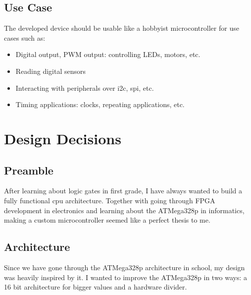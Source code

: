 \subsection*{Use Case}
The developed device should be usable like a hobbyist microcontroller for use cases such as:
\begin{itemize}
    \item Digital output, PWM output: controlling LEDs, motors, etc.
    \item Reading digital sensors
    \item Interacting with peripherals over i2c, spi, etc.
    \item Timing applications: clocks, repeating applications, etc.
\end{itemize}

\newpage
\tableofcontents
{}
\newpage

\section{Design Decisions}
\subsection{Preamble}
After learning about logic gates in first grade, I have always wanted to build a fully functional cpu architecture.
Together with going through FPGA development in electronics and learning about the ATMega328p in informatics, making a custom microcontroller seemed like a perfect thesis to me.

\subsection{Architecture}
Since we have gone through the ATMega328p architecture \cite{atmega328p} in school, my design was heavily inspired by it. 
I wanted to improve the ATMega328p in two ways: a 16 bit architecture for bigger values and a hardware divider.

